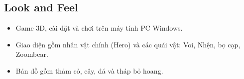 \documentclass[../report.tex]{subfiles}
\begin{document}
\subsection{Look and Feel}

\begin{itemize}
\item Game 3D, cài đặt và chơi trên máy tính PC Windows. 
\item Giao diện gồm nhân vật chính (Hero)
và các quái vật: Voi, Nhện, bọ cạp, Zoombear. 
\item Bản đồ gồm thảm cỏ, cây, đá và tháp bỏ hoang. 
\end{itemize}
\end{document}
